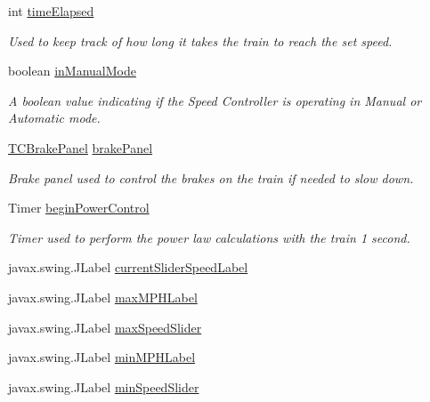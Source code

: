 \begin{DoxyCompactItemize}
int \hyperlink{classTrainControllerComps_1_1TCSpeedController_aa94c86762d0a9c73b32be1165d78b436}{time\+Elapsed}
\begin{DoxyCompactList}\small\item\em Used to keep track of how long it takes the train to reach the set speed. \end{DoxyCompactList}\item 
boolean \hyperlink{classTrainControllerComps_1_1TCSpeedController_a00ba0c34f85995b6c0f6d440f9661b22}{in\+Manual\+Mode}
\begin{DoxyCompactList}\small\item\em A boolean value indicating if the Speed Controller is operating in Manual or Automatic mode. \end{DoxyCompactList}\item 
\hyperlink{classTrainControllerComps_1_1TCBrakePanel}{T\+C\+Brake\+Panel} \hyperlink{classTrainControllerComps_1_1TCSpeedController_a539321041f3ef8431e32bd9fa9238541}{brake\+Panel}
\begin{DoxyCompactList}\small\item\em Brake panel used to control the brakes on the train if needed to slow down. \end{DoxyCompactList}\item 
Timer \hyperlink{classTrainControllerComps_1_1TCSpeedController_aa0bbb3afbc3ce25274a258dc7561df1e}{begin\+Power\+Control}
\begin{DoxyCompactList}\small\item\em Timer used to perform the power law calculations with the train 1 second. \end{DoxyCompactList}\item 
javax.\+swing.\+J\+Label \hyperlink{classTrainControllerComps_1_1TCSpeedController_aa8e5481a7f4ef453cbe6d1d3768657b7}{current\+Slider\+Speed\+Label}
\item 
javax.\+swing.\+J\+Label \hyperlink{classTrainControllerComps_1_1TCSpeedController_af060c649756f16edd6e2100629e2445d}{max\+M\+P\+H\+Label}
\item 
javax.\+swing.\+J\+Label \hyperlink{classTrainControllerComps_1_1TCSpeedController_a637084d67743ab5a28f41f02eaa5167c}{max\+Speed\+Slider}
\item 
javax.\+swing.\+J\+Label \hyperlink{classTrainControllerComps_1_1TCSpeedController_acf758cad7ad3d1f29392d8fab7a2312c}{min\+M\+P\+H\+Label}
\item 
javax.\+swing.\+J\+Label \hyperlink{classTrainControllerComps_1_1TCSpeedController_a2d1579eee22df41f38253c5cb07380a8}{min\+Speed\+Slider}

\end{DoxyCompactItemize}
